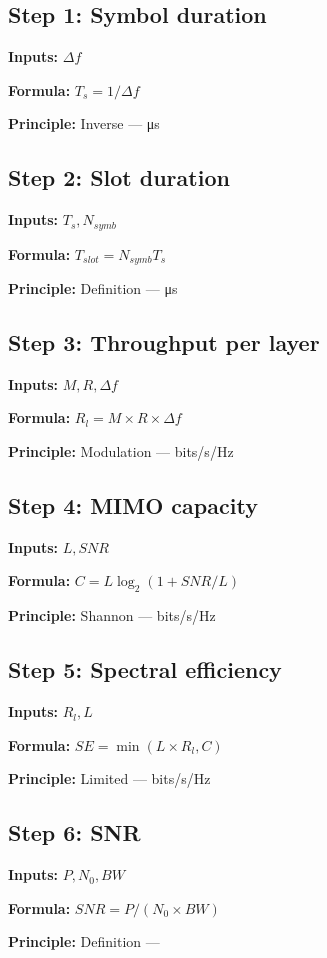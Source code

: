 \documentclass[11pt,twocolumn]{article}
\begin{document}
\subsection*{Step 1: Symbol duration}
\textbf{Inputs:} $\Delta f$

\textbf{Formula:} $T_s = 1/\Delta f$

\textbf{Principle:} Inverse --- μs

\subsection*{Step 2: Slot duration}
\textbf{Inputs:} $T_s, N_{symb}$

\textbf{Formula:} $T_{slot} = N_{symb} T_s$

\textbf{Principle:} Definition --- μs

\subsection*{Step 3: Throughput per layer}
\textbf{Inputs:} $M, R, \Delta f$

\textbf{Formula:} $R_l = M \times R \times \Delta f$

\textbf{Principle:} Modulation --- bits/s/Hz

\subsection*{Step 4: MIMO capacity}
\textbf{Inputs:} $L, SNR$

\textbf{Formula:} $C = L \log_2(1 + SNR/L)$

\textbf{Principle:} Shannon --- bits/s/Hz

\subsection*{Step 5: Spectral efficiency}
\textbf{Inputs:} $R_l, L$

\textbf{Formula:} $SE = \min(L \times R_l, C)$

\textbf{Principle:} Limited --- bits/s/Hz

\subsection*{Step 6: SNR}
\textbf{Inputs:} $P, N_0, BW$

\textbf{Formula:} $SNR = P / (N_0 \times BW)$

\textbf{Principle:} Definition --- 
\end{document}
